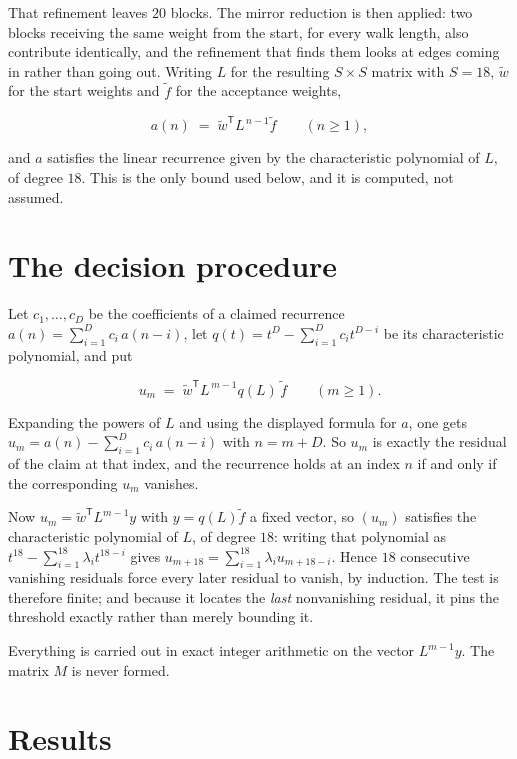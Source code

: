 \documentclass[11pt]{article}
\theoremstyle{definition}
\begin{document}
That refinement leaves $20$ blocks. The mirror reduction is then applied: two blocks receiving the same weight from the start, for every walk length, also contribute identically, and the refinement that finds them looks at edges coming in rather than going out. Writing $L$ for the resulting $S \times S$ matrix with $S = 18$, $\tilde w$ for the start weights and $\tilde f$ for the acceptance weights,

\[a(n) \;=\; \tilde w^{\mathsf T} L^{\,n-1} \tilde f \qquad (n \ge 1),\]

and $a$ satisfies the linear recurrence given by the characteristic polynomial of $L$, of degree $18$. This is the only bound used below, and it is computed, not assumed.

\section{The decision procedure}

Let $c_1,\dots,c_D$ be the coefficients of a claimed recurrence $a(n) = \sum_{i=1}^{D} c_i\,a(n-i)$, let $q(t) = t^{D} - \sum_{i=1}^{D} c_i t^{D-i}$ be its characteristic polynomial, and put

\[u_m \;=\; \tilde w^{\mathsf T} L^{\,m-1} q(L)\,\tilde f \qquad (m \ge 1).\]

Expanding the powers of $L$ and using the displayed formula for $a$, one gets $u_m = a(n) - \sum_{i=1}^{D} c_i\,a(n-i)$ with $n = m + D$. So $u_m$ is exactly the residual of the claim at that index, and the recurrence holds at an index $n$ if and only if the corresponding $u_m$ vanishes.

Now $u_m = \tilde w^{\mathsf T} L^{m-1} y$ with $y = q(L)\tilde f$ a fixed vector, so $(u_m)$ satisfies the characteristic polynomial of $L$, of degree $18$: writing that polynomial as $t^{18} - \sum_{i=1}^{18} \lambda_i t^{18-i}$ gives $u_{m+18} = \sum_{i=1}^{18} \lambda_i u_{m+18-i}$. Hence $18$ consecutive vanishing residuals force every later residual to vanish, by induction. The test is therefore finite; and because it locates the {\itshape last} nonvanishing residual, it pins the threshold exactly rather than merely bounding it.

Everything is carried out in exact integer arithmetic on the vector $L^{m-1}y$. The matrix $M$ is never formed.

\section{Results}
\end{document}
